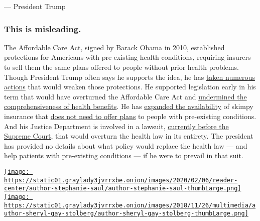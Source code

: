 --- President Trump

\hypertarget{this-is-misleading}{%
\subsubsection{This is misleading.}\label{this-is-misleading}}

The Affordable Care Act, signed by Barack Obama in 2010, established
protections for Americans with pre-existing health conditions, requiring
insurers to sell them the same plans offered to people without prior
health problems. Though President Trump often says he supports the idea,
he has
\href{https://slack-redir.net/link?url=https\%3A\%2F\%2Fwww.nytimes3xbfgragh.onion\%2F2020\%2F01\%2F13\%2Fupshot\%2Ftrump-tweets-health-care.html}{taken
numerous actions} that would weaken those protections. He supported
legislation early in his term that would have overturned the Affordable
Care Act and
\href{https://slack-redir.net/link?url=https\%3A\%2F\%2Fwww.nytimes3xbfgragh.onion\%2F2017\%2F04\%2F04\%2Fupshot\%2Ffreedom-caucus-health-care-pre-existing-conditions.html}{undermined
the comprehensiveness of health benefits}. He has
\href{https://slack-redir.net/link?url=https\%3A\%2F\%2Fwww.nytimes3xbfgragh.onion\%2F2018\%2F08\%2F01\%2Fus\%2Fpolitics\%2Ftrump-short-term-health-insurance.html}{expanded
the availability} of skimpy insurance that
\href{https://slack-redir.net/link?url=https\%3A\%2F\%2Fwww.nytimes3xbfgragh.onion\%2F2018\%2F08\%2F01\%2Fupshot\%2Fbuying-short-term-health-insurance-what-to-know.html}{does
not need to offer plans} to people with pre-existing conditions. And his
Justice Department is involved in a lawsuit,
\href{https://slack-redir.net/link?url=https\%3A\%2F\%2Fwww.nytimes3xbfgragh.onion\%2F2020\%2F03\%2F02\%2Fus\%2Fsupreme-court-obamacare-appeal.html}{currently
before the Supreme Court}, that would overturn the health law in its
entirety. The president has provided no details about what policy would
replace the health law --- and help patients with pre-existing
conditions --- if he were to prevail in that suit.

\href{https://www.nytimes3xbfgragh.onion/by/stephanie-saul}{\texttt{[image: https://static01.graylady3jvrrxbe.onion/images/2020/02/06/reader-center/author-stephanie-saul/author-stephanie-saul-thumbLarge.png]}}\href{https://www.nytimes3xbfgragh.onion/by/sheryl-gay-stolberg}{\texttt{[image: https://static01.graylady3jvrrxbe.onion/images/2018/11/26/multimedia/author-sheryl-gay-stolberg/author-sheryl-gay-stolberg-thumbLarge.png]}}

